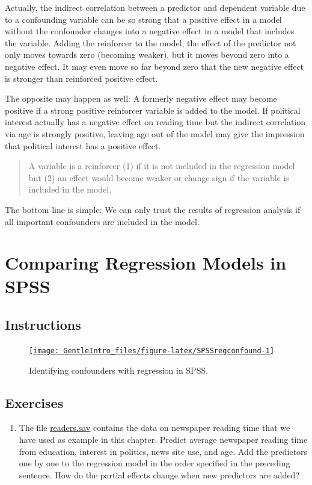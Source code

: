 \documentclass[a4paper]{book}
\providecommand{\tightlist}{%
  \setlength{\itemsep}{0pt}\setlength{\parskip}{0pt}}
\theoremstyle{definition}
\theoremstyle{definition}
\theoremstyle{definition}
\theoremstyle{remark}
\begin{document}
Actually, the indirect correlation between a predictor and dependent
variable due to a confounding variable can be so strong that a positive
effect in a model without the confounder changes into a negative effect
in a model that includes the variable. Adding the reinforcer to the
model, the effect of the predictor not only moves towards zero (becoming
weaker), but it moves beyond zero into a negative effect. It may even
move so far beyond zero that the new negative effect is stronger than
reinforced positive effect.

The opposite may happen as well: A formerly negative effect may become
positive if a strong positive reinforcer variable is added to the model.
If political interest actually has a negative effect on reading time but
the indirect correlation via age is strongly positive, leaving age out
of the model may give the impression that political interest has a
positive effect.

\begin{quote}
A variable is a reinforcer (1) if it is not included in the regression
model but (2) an effect would become weaker or change sign if the
variable is included in the model.
\end{quote}

The bottom line is simple: We can only trust the results of regression
analysis if all important confounders are included in the model.

\section{Comparing Regression Models in SPSS}\label{compmodelSSPSS}

\subsection{Instructions}\label{instructions-9}

\begin{figure}[H]
\href{https://www.youtube.com/embed/8dY7KmeFHN8}{\texttt{[image: GentleIntro\_files/figure-latex/SPSSregconfound-1]} }\caption{Identifying confounders with regression in SPSS.}\label{fig:SPSSregconfound}
\end{figure}

\subsection{Exercises}\label{exercises-10}

\begin{enumerate}
\def\labelenumi{\arabic{enumi}.}
\tightlist
\item
  The file \href{http://82.196.4.233:3838/data/readers.sav}{readers.sav}
  contains the data on newspaper reading time that we have used as
  example in this chapter. Predict average newspaper reading time from
  education, interest in politics, news site use, and age. Add the
  predictors one by one to the regression model in the order specified
  in the preceding sentence. How do the partial effects change when new
  predictors are added?
\end{enumerate}
\end{document}

